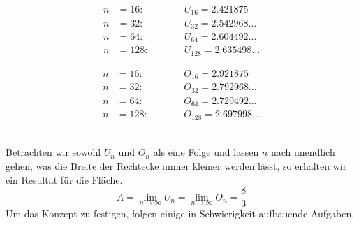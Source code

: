 \documentclass[11pt,oneside]{article}
\begin{document}
	\begin{minipage}[t]{0.49\textwidth}
		\begin{align*}
			n&=16:\qquad &&U_{16}=2.421875 \\
			n&=32:\qquad &&U_{32}=2.542968\ldots\\
			n&=64:\qquad &&U_{64}=2.604492\ldots\\
			n&=128:\qquad &&U_{128}=2.635498\ldots
		\end{align*}
	\end{minipage}
	\hfill
	\begin{minipage}[t]{0.49\textwidth}
		\begin{align*}
			n&=16:\qquad &&O_{16}=2.921875\\
			n&=32:\qquad &&O_{32}=2.792968\ldots\\
			n&=64:\qquad &&O_{64}=2.729492\ldots\\
			n&=128:\qquad &&O_{128}=2.697998\ldots
		\end{align*}
	\end{minipage}\vspace{10pt}\\
	Betrachten wir sowohl $U_n$ und $O_n$ als eine Folge und lassen $n$ nach unendlich gehen, was die Breite der Rechtecke immer kleiner werden lässt, so erhalten wir ein Resultat für die Fläche.
	\[A=\lim_{n\to\infty}U_n = \lim_{n\to\infty}O_n=\frac{8}{3}\]
	Um das Konzept zu festigen, folgen einige in Schwierigkeit aufbauende Aufgaben.
\end{document}
